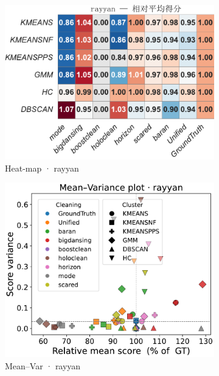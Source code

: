 \documentclass[10pt]{article} %
\numberwithin{equation}{section}
\begin{document}
\begin{figure}[htbp]
  \vspace{0.6em}
  \begin{subfigure}{0.33\linewidth}
    \centering
    \includegraphics[width=\linewidth]{figures/5.3.1graph/heatmap_rel_rayyan.pdf}
    \caption{Heat-map · rayyan}
  \end{subfigure}\hfill
  \begin{subfigure}{0.32\linewidth}
    \centering
    \includegraphics[width=\linewidth]{figures/5.3.1graph/mean_var_scatter_rayyan.pdf}
    \caption{Mean–Var · rayyan}
  \end{subfigure}\hfill
  \begin{subfigure}{0.34\linewidth}

\end{subfigure}
\end{figure}
\end{document}
